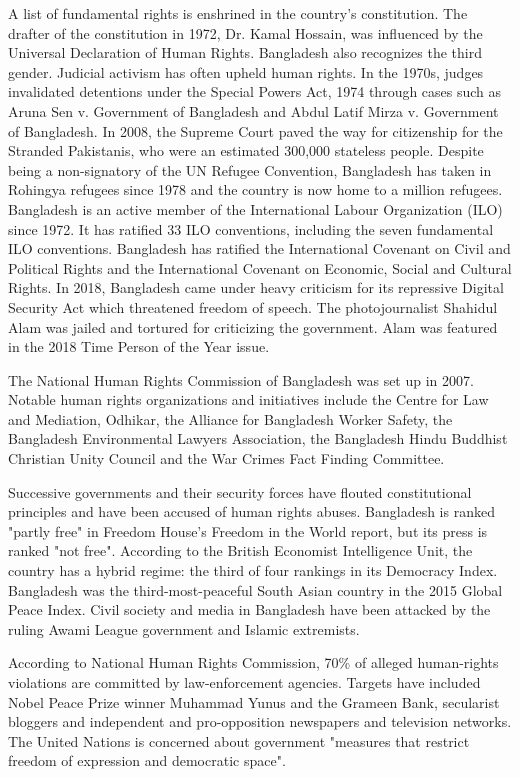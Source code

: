 A list of fundamental rights is enshrined in the country's constitution.
The drafter of the constitution in 1972, Dr. Kamal Hossain, was
influenced by the Universal Declaration of Human Rights. Bangladesh also
recognizes the third gender. Judicial activism has often upheld human
rights. In the 1970s, judges invalidated detentions under the Special
Powers Act, 1974 through cases such as Aruna Sen v. Government of
Bangladesh and Abdul Latif Mirza v. Government of Bangladesh. In 2008,
the Supreme Court paved the way for citizenship for the Stranded
Pakistanis, who were an estimated 300,000 stateless people. Despite
being a non-signatory of the UN Refugee Convention, Bangladesh has taken
in Rohingya refugees since 1978 and the country is now home to a million
refugees. Bangladesh is an active member of the International Labour
Organization (ILO) since 1972. It has ratified 33 ILO conventions,
including the seven fundamental ILO conventions. Bangladesh has ratified
the International Covenant on Civil and Political Rights and the
International Covenant on Economic, Social and Cultural Rights. In 2018,
Bangladesh came under heavy criticism for its repressive Digital
Security Act which threatened freedom of speech. The photojournalist
Shahidul Alam was jailed and tortured for criticizing the government.
Alam was featured in the 2018 Time Person of the Year issue.

The National Human Rights Commission of Bangladesh was set up in 2007.
Notable human rights organizations and initiatives include the Centre
for Law and Mediation, Odhikar, the Alliance for Bangladesh Worker
Safety, the Bangladesh Environmental Lawyers Association, the Bangladesh
Hindu Buddhist Christian Unity Council and the War Crimes Fact Finding
Committee.

Successive governments and their security forces have flouted
constitutional principles and have been accused of human rights abuses.
Bangladesh is ranked "partly free" in Freedom House's Freedom in the
World report, but its press is ranked "not free". According to the
British Economist Intelligence Unit, the country has a hybrid regime:
the third of four rankings in its Democracy Index. Bangladesh was the
third-most-peaceful South Asian country in the 2015 Global Peace Index.
Civil society and media in Bangladesh have been attacked by the ruling
Awami League government and Islamic extremists.

According to National Human Rights Commission, 70\% of alleged
human-rights violations are committed by law-enforcement agencies.
Targets have included Nobel Peace Prize winner Muhammad Yunus and the
Grameen Bank, secularist bloggers and independent and pro-opposition
newspapers and television networks. The United Nations is concerned
about government "measures that restrict freedom of expression and
democratic space".

